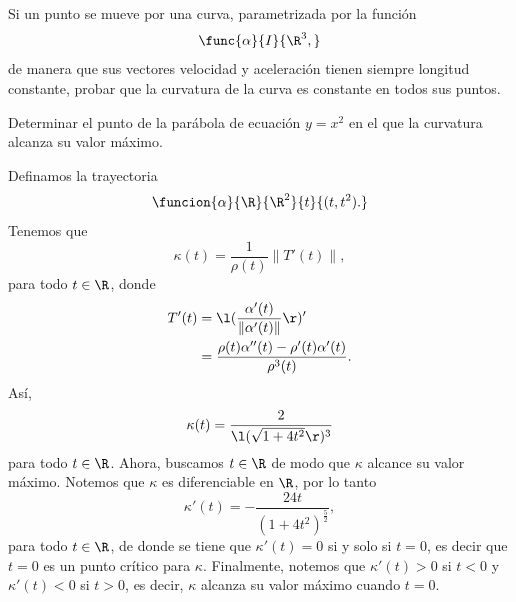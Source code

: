 \documentclass[a4,11pt]{aleph-examen}
\begin{document}
\begin{preguntas}
\item 
    Si un punto se mueve por una curva, parametrizada por la función
    \[
        \func{\alpha}{I}{\R^3,}
    \]
    de manera que sus vectores velocidad y aceleración tienen siempre longitud constante, probar que la curvatura de la curva es constante en todos sus puntos.


\item
    Determinar el punto de la parábola de ecuación $y=x^2$ en el que la curvatura alcanza su valor máximo. 
    
\begin{respuesta}
    Definamos la trayectoria
    \[
        \funcion{\alpha}{\R}{\R^2}{t}{(t,t^2).}
    \]
    Tenemos que
    \[
        \kappa(t)=\frac{1}{\rho(t)}\|T'(t)\|,
    \]
    para todo $t\in\R$, donde
    \begin{align*}
        T'(t)
            & = \l(\frac{\alpha'(t)}{\|\alpha'(t)\|}\r)' \\
            & = \frac{\rho(t)\alpha''(t)-\rho'(t)\alpha'(t)}{\rho^3(t)}.
    \end{align*}
    Así,
    \[
        \kappa(t)=\frac{2}{\l(\sqrt{1+4t^2}\r)^3}
    \]
    para todo $t\in\R$.
    Ahora, buscamos $t\in\R$ de modo que $\kappa$ alcance su valor máximo. Notemos que $\kappa$ es diferenciable en $\R$, por lo tanto
    \[
        \kappa'(t)=-\frac{24t}{(1+4t^2)^\frac{5}{2}},
    \]
    para todo $t\in\R$, de donde se tiene que $\kappa'(t)=0$ si y solo si $t=0$, es decir que $t=0$ es un punto crítico para $\kappa$. Finalmente, notemos que $\kappa'(t)>0$ si $t<0$ y $\kappa'(t)<0$ si $t>0$, es decir, $\kappa$ alcanza su valor máximo cuando $t=0$.
\end{respuesta}


\end{preguntas}
\end{document}
